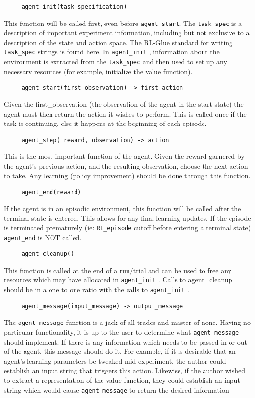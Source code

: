 \documentclass[11pt]{article}
\begin{document}
\begin{verbatim}
     agent_init(task_specification)
\end{verbatim}     
This function will be called first, even before \texttt{agent\_start}. The \texttt{task\_spec} is a description of important experiment information, including but not exclusive to a description of the state and action space. The RL-Glue standard for writing \texttt{task\_spec} strings is found here.  In \texttt{agent\_init} , information about the environment is extracted from the \texttt{task\_spec} and then used to set up any necessary resources (for example, initialize the value function).

\begin{verbatim}
     agent_start(first_observation) -> first_action
\end{verbatim}
Given the first\_observation (the observation of the agent in the start state) the agent must then return the action it wishes to perform. This is called once if the task is continuing, else it happens at the beginning of each episode.

\begin{verbatim}
     agent_step( reward, observation) -> action
\end{verbatim}
This is the most important function of the agent. Given the reward garnered by the agent's previous action, and the resulting observation, choose the next action to take. Any learning (policy improvement) should be done through this function.

\begin{verbatim}
     agent_end(reward)
\end{verbatim}     
If the agent is in an episodic environment, this function will be called after the terminal state is entered. This allows for any final learning updates. If the episode is terminated prematurely (ie: \texttt{RL\_episode} cutoff before entering a terminal state) \texttt{agent\_end} is NOT called.

\begin{verbatim}
     agent_cleanup()
\end{verbatim}     
This function is called at the end of a run/trial and can be used to free any resources which may have allocated in \texttt{agent\_init} . Calls to agent\_cleanup should be in a one to one ratio with the calls to \texttt{agent\_init} .

\begin{verbatim}
     agent_message(input_message) -> output_message
\end{verbatim}     
The \texttt{agent\_message} function is a jack of all trades and master of none. Having no particular functionality, it is up to the user to determine what \texttt{agent\_message} should implement. If there is any information which needs to be passed in or out of the agent, this message should do it. For example, if it is desirable that an agent's learning parameters be tweaked mid experiment, the author could establish an input string that triggers this action. Likewise, if the author wished to extract a representation of the value function, they could establish an input string which would cause \texttt{agent\_message} to return the desired information.
\end{document}
